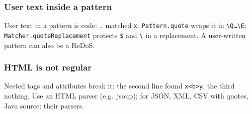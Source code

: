 \documentclass[aspectratio=169,10pt,compress]{beamer}
\begin{document}




\begin{frame}[t,fragile] \frametitle{User text inside a pattern}

  \vspace{0.2em}
  \small User text in a pattern is code: \texttt{.} matched \texttt{x}. \texttt{Pattern.quote} wraps it in \texttt{\textbackslash Q\dots\textbackslash E}; \texttt{Matcher.quoteReplacement} protects \texttt{\$} and \texttt{\textbackslash} in a replacement. A user-written pattern can also be a ReDoS.
\end{frame}





\begin{frame}[t,fragile] \frametitle{HTML is not regular}

  \vspace{0.2em}
  \small Nested tags and attributes break it: the second line found \texttt{x<b>y}, the third nothing. Use an HTML parser (e.g.\ jsoup); for JSON, XML, CSV with quotes, Java source: their parsers.
\end{frame}
\end{document}
